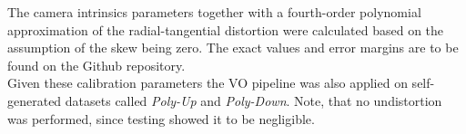 The camera intrinsics parameters together with a fourth-order polynomial approximation of the radial-tangential distortion were calculated based on the assumption of the skew being zero. The exact values and error margins are to be found on the Github repository.\\

Given these calibration parameters the VO pipeline was also applied on self-generated datasets called \textit{Poly-Up} and \textit{Poly-Down}. Note, that no undistortion was performed, since testing showed it to be negligible.


\clearpage{\pagestyle{plain}\cleardoublepage}

\clearpage{\pagestyle{plain}\cleardoublepage}